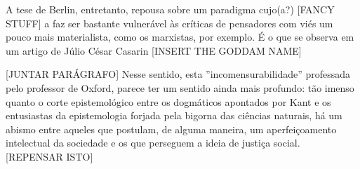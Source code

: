 \documentclass[12pt,a4paper]{article}
\begin{document}
	A tese de Berlin, entretanto, repousa sobre um paradigma cujo(a?)
	[FANCY STUFF] a faz ser bastante vulnerável às críticas de pensadores 
	com viés um pouco mais materialista, como os marxistas, por exemplo. 
	É o que se observa em um artigo de Júlio César Casarin [INSERT THE GODDAM NAME]
	
	[JUNTAR PARÁGRAFO]
	Nesse sentido, esta ”incomensurabilidade” professada pelo professor 
	de Oxford, parece ter um sentido ainda mais profundo: tão imenso  
	quanto o corte epistemológico entre os dogmáticos apontados por Kant 
	e os entusiastas da epistemologia forjada pela bigorna das ciências 
	naturais, há um abismo entre aqueles que postulam, de alguma maneira, 
	um aperfeiçoamento intelectual da sociedade e os que perseguem a ideia 
	de justiça social. [REPENSAR ISTO]
	

	
	
	
\end{document}

